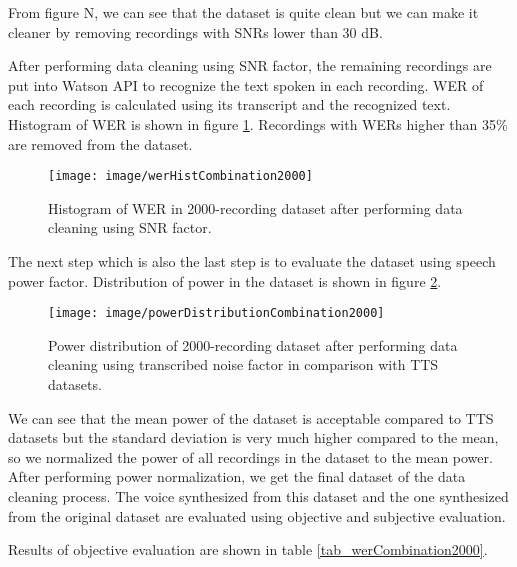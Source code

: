 \documentclass[12pt]{article}
\begin{document}
From figure N, we can see that the dataset is quite clean but we can make it cleaner by removing recordings with SNRs lower than 30 dB.

After performing data cleaning using SNR factor, the remaining recordings are put into Watson API to recognize the text spoken in each recording. WER of each recording is calculated using its transcript and the recognized text. Histogram of WER is shown in figure \ref{fig_werHistCombination2000}. Recordings with WERs higher than 35\% are removed from the dataset.

\begin{figure}[t]
\begin{center}
\texttt{[image: image/werHistCombination2000]}
\end{center}
\vspace{-0.3cm}
\caption[WER hist combination 2000.]{Histogram of WER in 2000-recording dataset after performing data cleaning using SNR factor.}
\label{fig_werHistCombination2000}
\end{figure}

The next step which is also the last step is to evaluate the dataset using speech power factor. Distribution of power in the dataset is shown in figure \ref{fig_powerDistributionCombination2000}.

\begin{figure}[t]
\begin{center}
\texttt{[image: image/powerDistributionCombination2000]}
\end{center}
\vspace{-0.3cm}
\caption[power distribution combination 2000.]{Power distribution of 2000-recording dataset after performing data cleaning using transcribed noise factor in comparison with TTS datasets.}
\label{fig_powerDistributionCombination2000}
\end{figure}

We can see that the mean power of the dataset is acceptable compared to TTS datasets but the standard deviation is very much higher compared to the mean, so we normalized the power of all recordings in the dataset to the mean power. After performing power normalization, we get the final dataset of the data cleaning process. The voice synthesized from this dataset and the one synthesized from the original dataset are evaluated using objective and subjective evaluation.

Results of objective evaluation are shown in table \ref{tab_werCombination2000}.
\end{document}
